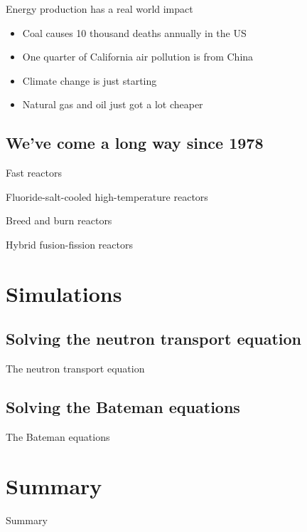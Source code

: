 \documentclass{beamer}
\begin{document}
    \begin{frame}{Energy production has a real world impact}

        \begin{itemize}
            \item Coal causes 10 thousand deaths annually in the US
            \pause
            \item One quarter of California air pollution is from China
            \pause
            \item Climate change is just starting
            \pause
            \item Natural gas and oil just got a lot cheaper
        \end{itemize}

    \end{frame}

\subsection{We've come a long way since 1978}

    \begin{frame}{Fast reactors}
    \end{frame}

    \begin{frame}{Fluoride-salt-cooled high-temperature reactors}
    \end{frame}

    \begin{frame}{Breed and burn reactors}
    \end{frame}

    \begin{frame}{Hybrid fusion-fission reactors}
    \end{frame}

\section{Simulations}

\subsection{Solving the neutron transport equation}

    \begin{frame}{The neutron transport equation}
    \end{frame}

\subsection{Solving the Bateman equations}

    \begin{frame}{The Bateman equations}
    \end{frame}

\section*{Summary}

    \begin{frame}{Summary}

    \end{frame}
\end{document}
